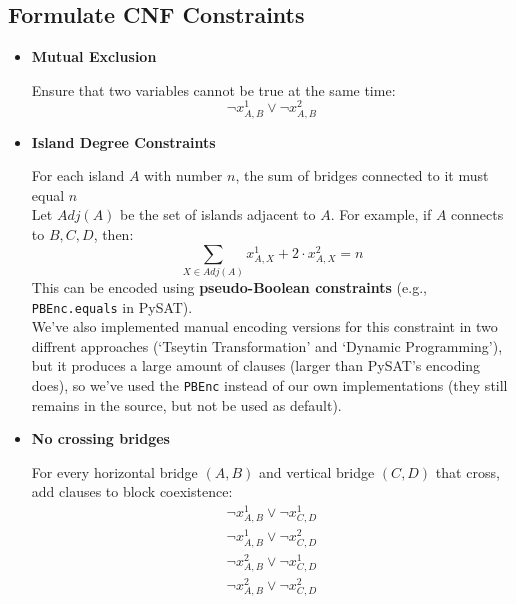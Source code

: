 \subsection{Formulate CNF Constraints}
\begin{itemize}
	\item \textbf{Mutual Exclusion}
	      \begin{flushleft}
		      Ensure that two variables cannot be true at the same time:
		      \begin{equation*}
			      \lnot x^1_{A,B} \lor \lnot x^2_{A,B}
		      \end{equation*}
	      \end{flushleft}
	\item \textbf{Island Degree Constraints}
	      \begin{flushleft}
		      For each island \(A\) with number \(n\), the sum of bridges connected to it must equal \(n\) \\
		      Let \(Adj(A)\) be the set of islands adjacent to \(A\). For example, if \(A\) connects to \(B, C, D\), then:
		      \begin{equation*}
			      \sum_{X \in Adj(A)} x^1_{A,X} + 2 \cdot x^2_{A,X} = n
		      \end{equation*}
		      This can be encoded using \textbf{pseudo-Boolean constraints} (e.g., \verb|PBEnc.equals| in PySAT).\\
		      We've also implemented manual encoding versions for this constraint in two diffrent approaches (`Tseytin Transformation' and `Dynamic Programming'), but it produces a large amount of clauses (larger than PySAT's encoding does), so we've used the \verb|PBEnc| instead of our own implementations (they still remains in the source, but not be used as default).\\
	      \end{flushleft}
	\item \textbf{No crossing bridges}
	      \begin{flushleft}
		      For every horizontal bridge \((A,B)\) and vertical bridge \((C,D)\) that cross, add clauses to block coexistence:
		      \begin{gather*}
			      \lnot x^1_{A,B} \lor \lnot x^1_{C,D} \\
			      \lnot x^1_{A,B} \lor \lnot x^2_{C,D} \\
			      \lnot x^2_{A,B} \lor \lnot x^1_{C,D} \\
			      \lnot x^2_{A,B} \lor \lnot x^2_{C,D}
		      \end{gather*}

\end{flushleft}
\end{itemize}
